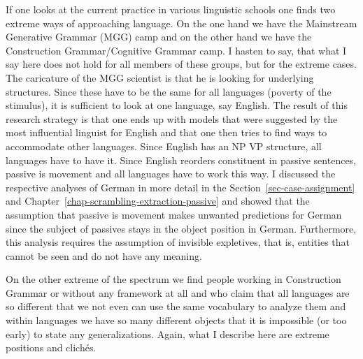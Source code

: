 If one looks at the current practice in various linguistic schools one finds two extreme ways of
approaching language. On the one hand we have the Mainstream Generative Grammar (MGG) camp and on the
other hand we have the Construction Grammar/Cognitive Grammar camp. I hasten to say, that what I say
here does not hold for all members of these groups, but for the extreme cases. The caricature of the
MGG scientist is that he is looking for underlying structures. Since these have to be the same for
all languages (poverty of the stimulus), it is sufficient to look at one language, say English. The
result of this research strategy is that one ends up with models that were suggested by the most
influential linguist for English and that one then tries to find ways to accommodate other
languages. Since English has an NP VP structure, all languages have to have it. Since English reorders
constituent in passive sentences, passive is movement and all languages have to work this way. I
discussed the respective analyses of German in more detail in the Section~\ref{sec-case-assignment}
and Chapter~\ref{chap-scrambling-extraction-passive} and showed that the assumption that passive is movement
makes unwanted predictions for German since the subject of passives stays in the object
position in German. Furthermore, this analysis requires the assumption of invisible expletives, that is,
entities that cannot be seen and do not have any meaning.

On the other extreme of the spectrum we find people working in Construction Grammar or without any
framework at all and who claim
that all languages are so different that we not even can use the same vocabulary to analyze them and
within languages we have so many different objects that it is impossible (or too early) to state any
generalizations. Again, what I describe here are extreme positions and clichés.

